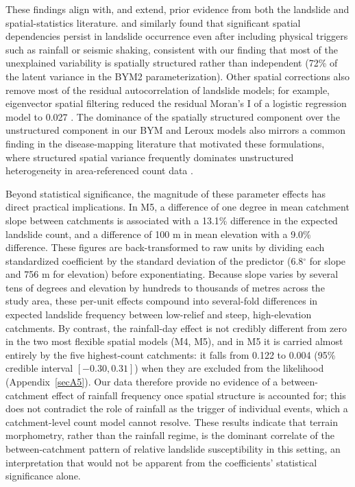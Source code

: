 \documentclass[journal abbreviation, manuscript]{copernicus}
\newcommand{\hl}[1]{#1}
\newcommand{\hlE}[1]{#1}
\begin{document}
\hl{These findings align with, and extend, prior evidence from both the landslide and spatial-statistics literature. }
\citet{lombardo2019geostatistical}\hl{ and }\citet{lombardo2020space}\hl{ similarly found that significant spatial dependencies persist in landslide occurrence even after including physical triggers such as rainfall or seismic shaking, consistent with our finding that} \hlE{most of the unexplained variability is spatially structured rather than independent (72\% of the latent variance in the BYM2 parameterization). Other spatial corrections also remove most of the residual autocorrelation of landslide models; for example, eigenvector spatial filtering reduced the residual Moran's I of a logistic regression model to 0.027 }\citep{li2019eigenvector}\hlE{.} \hl{The dominance of the spatially structured component over the unstructured component in our BYM and Leroux models also mirrors a common finding in the disease-mapping literature that motivated these formulations, where structured spatial variance frequently dominates unstructured heterogeneity in area-referenced count data }\citep{lawson2018bayesian, morris2019bayesian}\hl{.}

\hlE{Beyond statistical significance, the magnitude of these parameter effects has direct practical implications.} \hlE{In M5, a difference of one degree in mean catchment slope between catchments is associated with a 13.1\% difference in the expected landslide count, and a difference of 100 m in mean elevation with a 9.0\% difference. These figures are back-transformed to raw units by dividing each standardized coefficient by the standard deviation of the predictor (6.8$^{\circ}$ for slope and 756 m for elevation) before exponentiating. Because slope varies by several tens of degrees and elevation by hundreds to thousands of metres across the study area, these per-unit effects compound into several-fold differences in expected landslide frequency between low-relief and steep, high-elevation catchments. 
By contrast, the rainfall-day effect is not credibly different from zero in the two most flexible spatial models (M4, M5), and in M5 it is carried almost entirely by the five highest-count catchments: it falls from 0.122 to 0.004 (95\% credible interval $[-0.30, 0.31]$) when they are excluded from the likelihood (\mbox{Appendix~\ref{secA5}}). Our data therefore provide no evidence of a between-catchment effect of rainfall frequency once spatial structure is accounted for; this does not contradict the role of rainfall as the trigger of individual events, which a catchment-level count model cannot resolve.} 
\hlE{These results indicate that terrain morphometry, rather than the rainfall regime, is the dominant correlate of the between-catchment pattern of relative landslide susceptibility in this setting, an interpretation that would not be apparent from the coefficients' statistical significance alone.}
\end{document}
